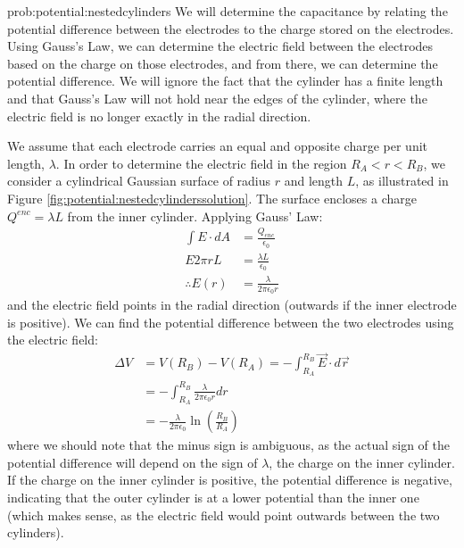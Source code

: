 \begin{solution}{prob:potential:nestedcylinders}\label{soln:potential:nestedcylinders} We will determine the capacitance by relating the potential difference between the electrodes to the charge stored on the electrodes. Using Gauss's Law, we can determine the electric field between the electrodes based on the charge on those electrodes, and from there, we can determine the potential difference. We will ignore the fact that the cylinder has a finite length and that Gauss's Law will not hold near the edges of the cylinder, where the electric field is no longer exactly in the radial direction.

We assume that each electrode carries an equal and opposite charge per unit length, $\lambda$. In order to determine the electric field in the region $R_A<r<R_B$, we consider a cylindrical Gaussian surface of radius $r$ and length $L$, as illustrated in Figure \ref{fig:potential:nestedcylinderssolution}. The surface encloses a charge $Q^{enc}=\lambda L$ from the inner cylinder. 
Applying Gauss' Law:
\begin{align*}
\int E\cdot dA &= \frac{Q_{enc}}{\epsilon_0}\\
E 2\pi rL &= \frac{\lambda L}{\epsilon_0}\\
\therefore E(r) &= \frac{\lambda }{2\pi \epsilon_0 r}
\end{align*}
and the electric field points in the radial direction (outwards if the inner electrode is positive). We can find the potential difference between the two electrodes using the electric field:
\begin{align*}
\Delta V &= V(R_B)-V(R_A)= -\int_{R_A}^{R_B} \vec E \cdot d\vec r\\
&=-\int_{R_A}^{R_B} \frac{\lambda }{2\pi \epsilon_0 r} dr\\
&= -\frac{\lambda }{2\pi \epsilon_0}\ln\left( \frac{R_B}{R_A} \right) 
\end{align*}
where we should note that the minus sign is ambiguous, as the actual sign of the potential difference will depend on the sign of $\lambda$, the charge on the inner cylinder. If the charge on the inner cylinder is positive, the potential difference is negative, indicating that the outer cylinder is at a lower potential than the inner one (which makes sense, as the electric field would point outwards between the two cylinders). 


\end{solution}
